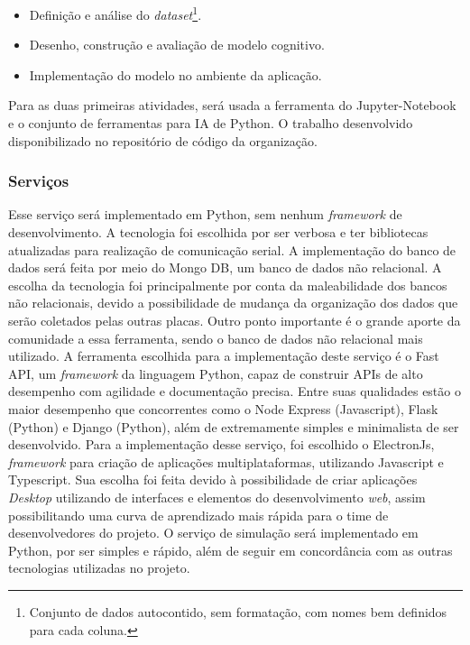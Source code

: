 \begin{itemize}
    \item Definição e análise do  \textit{dataset}\footnote{Conjunto de dados autocontido, sem formatação, com nomes bem definidos para cada coluna.}.
    \item Desenho, construção e avaliação de modelo cognitivo.
    \item Implementação do modelo no ambiente da aplicação.
\end{itemize}

Para as duas primeiras atividades, será usada a ferramenta do Jupyter-Notebook e o conjunto de ferramentas para IA de Python. O trabalho desenvolvido disponibilizado no repositório de código da organização. \cite{repositorio}

\subsubsection{Serviços}

Esse serviço será implementado em Python, sem nenhum  \textit{framework} de desenvolvimento. A tecnologia foi escolhida por ser verbosa e ter bibliotecas atualizadas para realização de comunicação serial. \cite{python}
A implementação do banco de dados será feita por meio do Mongo DB, um banco de dados não relacional. A escolha da tecnologia foi principalmente por conta da maleabilidade dos bancos não relacionais, devido a possibilidade de mudança da organização dos dados que serão coletados pelas outras placas. Outro ponto importante é o grande aporte da comunidade a essa ferramenta, sendo o banco de dados não relacional mais utilizado.\cite{mongo-db}
A ferramenta escolhida para a implementação deste serviço é o Fast API, um  \textit{framework} da linguagem Python, capaz de construir APIs de alto desempenho com agilidade e documentação precisa. Entre suas qualidades estão o maior desempenho que concorrentes como o Node Express (Javascript), Flask (Python) e Django (Python), além de extremamente simples e minimalista de ser desenvolvido.\cite{fast-api}
Para a implementação desse serviço, foi escolhido o ElectronJs,  \textit{framework} para criação de aplicações multiplataformas, utilizando Javascript e Typescript. Sua escolha foi feita devido à possibilidade de criar aplicações  \textit{Desktop} utilizando de interfaces e elementos do desenvolvimento  \textit{web}, assim possibilitando uma curva de aprendizado mais rápida para o time de desenvolvedores do projeto. \cite{electron}
O serviço de simulação será implementado em Python, por ser simples e rápido, além de seguir em concordância com as outras tecnologias utilizadas no projeto.


